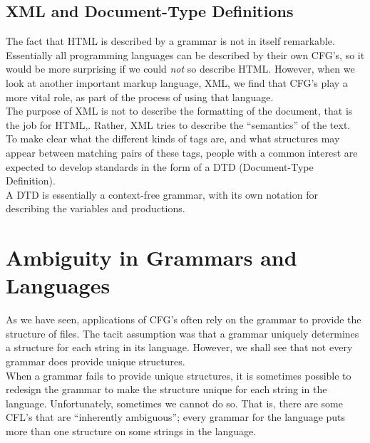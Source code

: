 \documentclass[]{article}
\begin{document}
  \subsection*{XML and Document-Type Definitions}
    The fact that HTML is described by a grammar is not in itself remarkable.
    Essentially all programming languages can be described by their own CFG's,
    so it would be more surprising if we could \emph{not} so describe HTML.
    However, when we look at another important markup language, XML, we find
    that CFG's play a more vital role, as part of the process of using that
    language. \\
    \indent The purpose of XML is not to describe the formatting of the
    document, that is the job for HTML,. Rather, XML tries to describe the
    ``semantics'' of the text. \\
    \indent To make clear what the different kinds of tags are, and what
    structures may appear between matching pairs of these tags, people with a
    common interest are expected to develop standards in the form of a DTD
    (Document-Type Definition). \\
    \indent A DTD is essentially a context-free grammar, with its own notation
    for describing the variables and productions.

\section*{Ambiguity in Grammars and Languages}
  As we have seen, applications of CFG's often rely on the grammar to provide
  the structure of files. The tacit assumption was that a grammar uniquely
  determines a structure for each string in its language. However, we shall see
  that not every grammar does provide unique structures. \\
  \indent When a grammar fails to provide unique structures, it is sometimes
  possible to redesign the grammar to make the structure unique for each string
  in the language. Unfortunately, sometimes we cannot do so. That is, there are
  some CFL's that are ``inherently ambiguous''; every grammar for the language
  puts more than one structure on some strings in the language.
\end{document}
